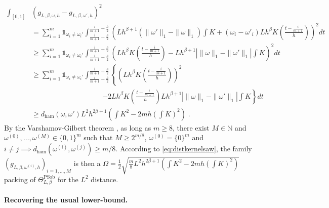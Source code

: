 \documentclass[10pt]{article} %
\def\Ind{\mathds{1}}
\newcommand{\N}[0]{\mathbb{N}}
\newcommand\ham[2]{d_\mathrm{ham}\left( {#1}, {#2} \right)}
\newcommand\p[1]{\left( {#1}\right)}
\newcommand\RG[1]{\textcolor{red}{#1}}
\begin{document}
\begin{equation}
\label{eq:distkernelsaw}
\begin{aligned}
    \int_{[0, 1]} &\p{g_{L, \beta, \omega, h} - g_{L, \beta, \omega', h}}^2 \\
    &= 
    \sum_{i=1}^m \Ind_{\omega_i \neq \omega_i'} \int_{\frac{i}{m+1} - \frac{h}{2}}^{\frac{i}{m+1} + \frac{h}{2}}
    \p{L h^{\beta + 1} \p{\| \omega' \|_1 - \| \omega \|_1} \int K +(\omega_i-\omega'_i) L h^{\beta } K\p{\frac{t-\frac{i}{m+1} }{h}}}^2 dt\\
    &\geq 
    \sum_{i=1}^m \Ind_{\omega_i \neq \omega_i'} \int_{\frac{i}{m+1} - \frac{h}{2}}^{\frac{i}{m+1} + \frac{h}{2}}
    \p{L h^{\beta } K\p{\frac{t-\frac{i}{m+1}}{h}} - L h^{\beta + 1} \left|\| \omega \|_1 - \| \omega' \|_1\right| \int K}^2 dt \\
    &\geq
    \sum_{i=1}^m \Ind_{\omega_i \neq \omega_i'} \int_{\frac{i}{m+1} - \frac{h}{2}}^{\frac{i}{m+1} + \frac{h}{2}}
    \left\{\p{L h^{\beta } K\p{\frac{t-\frac{i}{m+1}}{h}}}^2 \right.\\
    &\quad\quad\quad\quad\quad\quad\quad\quad\quad\quad \left.- 2 L h^{\beta } K\p{\frac{t-\frac{i}{m+1}}{h}} L h^{\beta + 1} \left|\| \omega \|_1 - \| \omega' \|_1\right| \int K \right\} dt\\ 
    &\geq
    \ham{\omega}{\omega '} L^2h^{2 \beta + 1}\p{  \int K^2 - 2m h \p{\int K}^2} \;.
\end{aligned}
\end{equation}
By the Varshamov-Gilbert theorem \citep[Lemma 2.7]{tsybakov2003introduction}, as long as $m \geq 8$, there exist $M \in \N$ and $\omega^{(0)}, \dots, \omega^{(M)} \in \{ 0, 1 \}^m$ such that $M \geq 2^{m/8}$, $\omega^{(0)} = \{0\}^m$ and $i \neq j \implies \ham{\omega^{(i)}}{\omega^{(j)}} \geq m/8$. According to \eqref{eq:distkernelsaw}, the family $\p{g_{L, \beta, \omega^{(i)}, h}}_{i=1, \dots, M}$ is then a $\Omega = \frac{1}{2} \sqrt{\frac{m}{8}  L^2 h^{2 \beta + 1} \p{ \int K^2 - 2m h \p{\int K}^2}}$ packing of $\Theta^{\text{PSob}}_{L, \beta}$ for the $L^2$ distance.

\paragraph{Recovering the usual lower-bound.}
\end{document}
